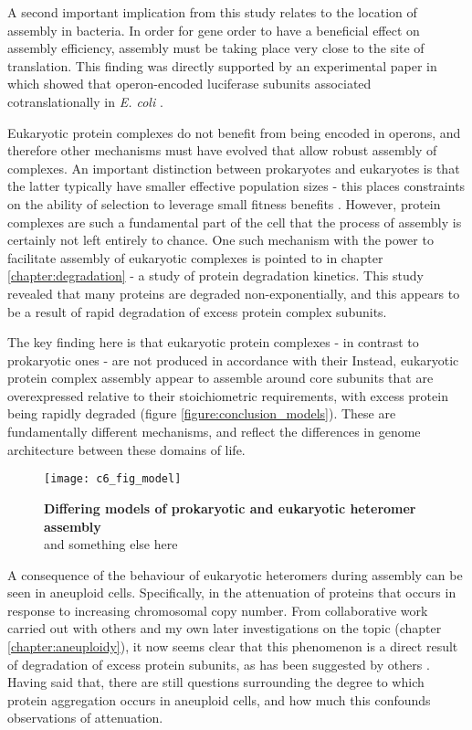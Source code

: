 \documentclass[a4paper,11pt,twoside,openright]{scrbook}
\begin{document}
A second important implication from this study relates to the location of assembly in bacteria. In order for gene order to have a beneficial effect on assembly efficiency, assembly must be taking place very close to the site of translation. This finding was directly supported by an experimental paper in which showed that operon-encoded luciferase subunits associated cotranslationally in \textit{E. coli} \cite{Shieh2015a}.

Eukaryotic protein complexes do not benefit from being encoded in operons, and therefore other mechanisms must have evolved that allow robust assembly of complexes. An important distinction between prokaryotes and eukaryotes is that the latter typically have smaller effective population sizes - this places constraints on the ability of selection to leverage small fitness benefits \cite{Kimura1962,Lynch2011}. However, protein complexes are such a fundamental part of the cell that the process of assembly is certainly not left entirely to chance. One such mechanism with the power to facilitate assembly of eukaryotic complexes is pointed to in chapter \ref{chapter:degradation} - a study of protein degradation kinetics. This study revealed that many proteins are degraded non-exponentially, and this appears to be a result of rapid degradation of excess protein complex subunits.

The key finding here is that eukaryotic protein complexes - in contrast to prokaryotic ones \cite{Li2014b} - are not produced in accordance with their Instead, eukaryotic protein complex assembly appear to assemble around core subunits that are overexpressed relative to their stoichiometric requirements, with excess protein being rapidly degraded (figure \ref{figure:conclusion_models}). These are fundamentally different mechanisms, and reflect the differences in genome architecture between these domains of life.

\begin{figure}
    \texttt{[image: c6\_fig\_model]}
    \caption[Differing models of prokaryotic and eukaryotic heteromer assembly]{\sffamily \textbf{Differing models of prokaryotic and eukaryotic heteromer assembly} \\ \small and something else here}
\end{figure}

A consequence of the behaviour of eukaryotic heteromers during assembly can be seen in aneuploid cells. Specifically, in the attenuation of proteins that occurs in response to increasing chromosomal copy number. From collaborative work carried out with others \cite{McShane2016} and my own later investigations on the topic (chapter \ref{chapter:aneuploidy}), it now seems clear that this phenomenon is a direct result of degradation of excess protein subunits, as has been suggested by others \cite{Dephoure2014,Mueller2015}. Having said that, there are still questions surrounding the degree to which protein aggregation occurs in aneuploid cells, and how much this confounds observations of attenuation.
\end{document}
